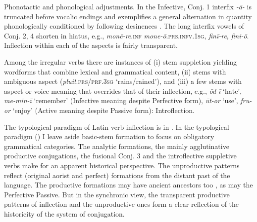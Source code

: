 \documentclass[output=paper, colorlinks,citecolor=brown]{langsci/langscibook}
\begin{document}
Phonotactic and phonological adjustments. In the Infective, Conj. 1 interfix \textit{-ā-} is truncated before vocalic endings  and exemplifies a general alternation in quantity phonologically conditioned by following desinences . The long interfix vowels of Conj. 2, 4 shorten in hiatus, e.g., \textit{monē-re}.\textsc{inf} \textit{mone-ō}.\textsc{prs.infv.1sg}, \textit{finī-re}, \textit{fini-ō}. Inflection within each of the aspects is fairly transparent. 

Among the irregular verbs there are instances of (i) stem suppletion yielding wordforms that combine lexical and grammatical content, (ii) stems with ambiguous aspect (\textit{pluit}.\textsc{prs/prf.3sg} `rains/rained'), and (iii) a few stems with aspect or voice meaning that overrides that of their inflection, e.g., \textit{ōd-ī} `hate', \textit{me-min-ī} `remember' (Infective meaning despite Perfective form), \textit{ūt-or} `use', \textit{fru-or} `enjoy' (Active meaning despite Passive form): Introflection. 

The typological paradigm of Latin verb inflection is in . In the typological paradigm () I leave aside basic-stem formation to focus on obligatory grammatical categories. The analytic formations, the mainly agglutinative productive conjugations, the fusional Conj. 3 and the introflective suppletive verbs make for an apparent historical perspective. The unproductive patterns reflect (original aorist and perfect) formations from the distant past of the language. The productive formations may have ancient ancestors too \citep{Sihler2010}, as may the Perfective Passive. But in the synchronic view, the transparent productive patterns of inflection and the unproductive ones form a clear reflection of the historicity of the system of conjugation. 
\end{document}
